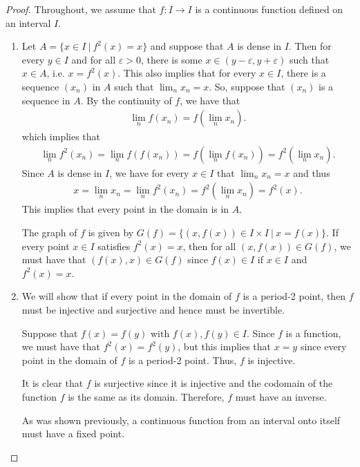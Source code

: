 \begin{proof}
  Throughout, we assume that $f: I \to I$ is a continuous function defined on an interval $I$.

  \begin{enumerate}
    \item Let $A = \{x \in I \ |\ f^2(x) = x\}$ and suppose that $A$
      is dense in $I$. Then for every $y\in I$ and for all $\varepsilon >0$,
      there is some $x\in(y-\varepsilon, y+\varepsilon)$ such that $x \in A$, i.e. $x= f^2(x)$.
      This also implies that for every $x \in I$, there is a sequence $(x_n)$ in $A$
      such that $\lim_n x_n = x$. So, suppose that $(x_n)$ is a sequence in $A$.
      By the continuity of $f$, we have that
      \begin{align*}
        \lim_n f(x_n) = f(\lim_n x_n).
      \end{align*}
      which implies that
      \begin{align*}
        \lim_n f^2(x_n) = \lim_n f(f(x_n)) = f(\lim_n f(x_n)) = f^2(\lim_n x_n).
      \end{align*}
      Since $A$ is dense in $I$, we have for every $x\in I$ that $\lim_n x_n = x$ and thus
      \begin{align*}
        x = \lim_n x_n = \lim_n f^2(x_n) = f^2(\lim_n x_n) = f^2(x).
      \end{align*}
      This implies that every point in the domain is in $A$.

      The graph of $f$ is given by $G(f) = \{ (x, f(x)) \in I \times I \ |\ x = f(x)\}$. If
      every point $x \in I$ satisfies $f^2(x) = x$, then for all $(x, f(x)) \in G(f)$, we must have
      that $(f(x), x) \in G(f)$ since $f(x) \in I$ if $x \in I$ and
      $f^2(x) = x$.

    \item We will show that if every point in the domain of $f$ is a period-2 point,
      then $f$ must be injective and surjective and hence must be invertible.

      Suppose that $f(x) = f(y)$ with $f(x), f(y) \in I$. Since $f$ is a function, we must have
      that $f^2(x) = f^2(y)$, but this implies that $x =y$ since every point in the domain of $f$ is a period-2 point.
      Thus, $f$ is injective.

      It is clear that $f$ is surjective since it is injective and the codomain of the function $f$ is
      the same as its domain. Therefore, $f$ must have an inverse.

      As was shown previously, a continuous function from an interval onto itself
      must have a fixed point.


\end{enumerate}
\end{proof}
